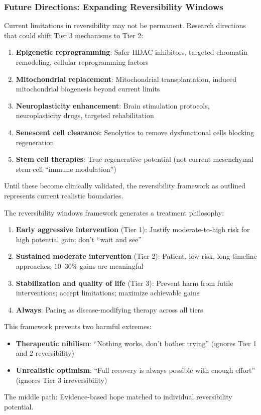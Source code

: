 \subsubsection{Future Directions: Expanding Reversibility Windows}

Current limitations in reversibility may not be permanent. Research directions that could shift Tier 3 mechanisms to Tier 2:

\begin{enumerate}
    \item \textbf{Epigenetic reprogramming}: Safer HDAC inhibitors, targeted chromatin remodeling, cellular reprogramming factors
    \item \textbf{Mitochondrial replacement}: Mitochondrial transplantation, induced mitochondrial biogenesis beyond current limits
    \item \textbf{Neuroplasticity enhancement}: Brain stimulation protocols, neuroplasticity drugs, targeted rehabilitation
    \item \textbf{Senescent cell clearance}: Senolytics to remove dysfunctional cells blocking regeneration
    \item \textbf{Stem cell therapies}: True regenerative potential (not current mesenchymal stem cell ``immune modulation'')
\end{enumerate}

Until these become clinically validated, the reversibility framework as outlined represents current realistic boundaries.

\begin{keypoint}
The reversibility windows framework generates a treatment philosophy:

\begin{enumerate}
    \item \textbf{Early aggressive intervention} (Tier 1): Justify moderate-to-high risk for high potential gain; don't ``wait and see''
    \item \textbf{Sustained moderate intervention} (Tier 2): Patient, low-risk, long-timeline approaches; 10--30\% gains are meaningful
    \item \textbf{Stabilization and quality of life} (Tier 3): Prevent harm from futile interventions; accept limitations; maximize achievable gains
    \item \textbf{Always}: Pacing as disease-modifying therapy across all tiers
\end{enumerate}

This framework prevents two harmful extremes:
\begin{itemize}
    \item \textbf{Therapeutic nihilism}: ``Nothing works, don't bother trying'' (ignores Tier 1 and 2 reversibility)
    \item \textbf{Unrealistic optimism}: ``Full recovery is always possible with enough effort'' (ignores Tier 3 irreversibility)
\end{itemize}

The middle path: Evidence-based hope matched to individual reversibility potential.
\end{keypoint}

